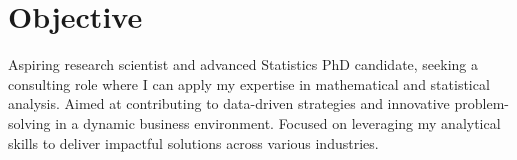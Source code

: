 \section{Objective}
Aspiring research scientist and advanced Statistics PhD candidate, seeking a consulting role where I can apply my expertise in mathematical and statistical analysis. Aimed at contributing to data-driven strategies and innovative problem-solving in a dynamic business environment. Focused on leveraging my analytical skills to deliver impactful solutions across various industries.


